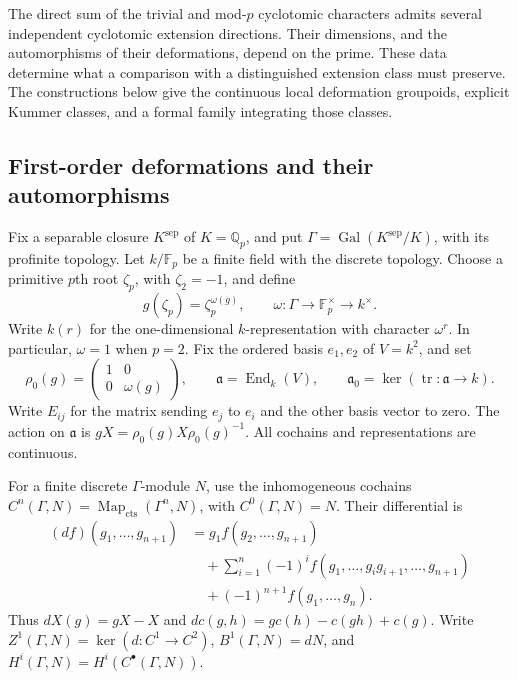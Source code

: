 The direct sum of the trivial and mod-\(p\) cyclotomic characters
admits several independent cyclotomic extension directions. Their dimensions, and the automorphisms
of their deformations, depend on the prime. These data determine what a
comparison with a distinguished extension class must preserve.
The constructions below give the continuous local deformation groupoids,
explicit Kummer classes, and a formal family integrating those classes.

\subsection{First-order deformations and their automorphisms}

Fix a separable closure \(K^{\mathrm{sep}}\) of \(K=\mathbb Q_p\), and
put \(\Gamma=\operatorname{Gal}(K^{\mathrm{sep}}/K)\), with its profinite topology.
Let \(k/\mathbb F_p\) be a finite field with the discrete topology.
Choose a primitive \(p\)th root \(\zeta_p\), with \(\zeta_2=-1\), and define
\[
 g(\zeta_p)=\zeta_p^{\omega(g)},\qquad
 \omega:\Gamma\longrightarrow\mathbb F_p^\times\longrightarrow k^\times.
\]
Write \(k(r)\) for the one-dimensional \(k\)-representation with character
\(\omega^r\). In particular, \(\omega=1\) when \(p=2\).
Fix the ordered basis \(e_1,e_2\) of \(V=k^2\), and set
\[
 \rho_0(g)=\begin{pmatrix}1&0\\0&\omega(g)\end{pmatrix},\qquad
 \mathfrak a=\operatorname{End}_k(V),\qquad
 \mathfrak a_0=\ker(\operatorname{tr}:\mathfrak a\to k).
\]
Write \(E_{ij}\) for the matrix sending \(e_j\) to \(e_i\) and the other basis vector to zero.
The action on \(\mathfrak a\) is \(gX=\rho_0(g)X\rho_0(g)^{-1}\).
All cochains and representations are continuous.

For a finite discrete \(\Gamma\)-module \(N\), use the inhomogeneous cochains
\(C^n(\Gamma,N)=\operatorname{Map}_{\mathrm{cts}}(\Gamma^n,N)\), with \(C^0(\Gamma,N)=N\).
Their differential is
\begin{align*}
 (df)(g_1,\ldots,g_{n+1})
 &=g_1f(g_2,\ldots,g_{n+1})\\
 &\quad+\sum_{i=1}^n(-1)^i
 f(g_1,\ldots,g_ig_{i+1},\ldots,g_{n+1})\\
 &\quad+(-1)^{n+1}f(g_1,\ldots,g_n).
\end{align*}
Thus \(dX(g)=gX-X\) and
\(dc(g,h)=gc(h)-c(gh)+c(g)\).
Write \(Z^1(\Gamma,N)=\ker(d:C^1\to C^2)\),
\(B^1(\Gamma,N)=dN\), and \(H^i(\Gamma,N)=H^i(C^\bullet(\Gamma,N))\).

